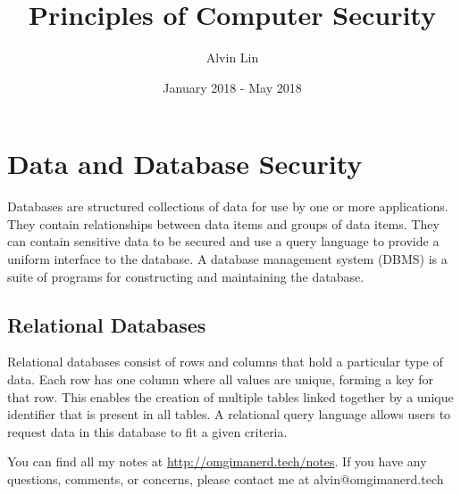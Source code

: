 \documentclass{math}
\title{Principles of Computer Security}
\author{Alvin Lin}
\date{January 2018 - May 2018}
\begin{document}
\maketitle

\section*{Data and Database Security}
Databases are structured collections of data for use by one or more
applications. They contain relationships between data items and groups of data
items. They can contain sensitive data to be secured and use a query language
to provide a uniform interface to the database. A database management system
(DBMS) is a suite of programs for constructing and maintaining the database.

\subsection*{Relational Databases}
Relational databases consist of rows and columns that hold a particular type of
data. Each row has one column where all values are unique, forming a key for
that row. This enables the creation of multiple tables linked together by a
unique identifier that is present in all tables. A relational query language
allows users to request data in this database to fit a given criteria.

\begin{center}
  You can find all my notes at \url{http://omgimanerd.tech/notes}. If you have
  any questions, comments, or concerns, please contact me at
  alvin@omgimanerd.tech
\end{center}
\end{document}
